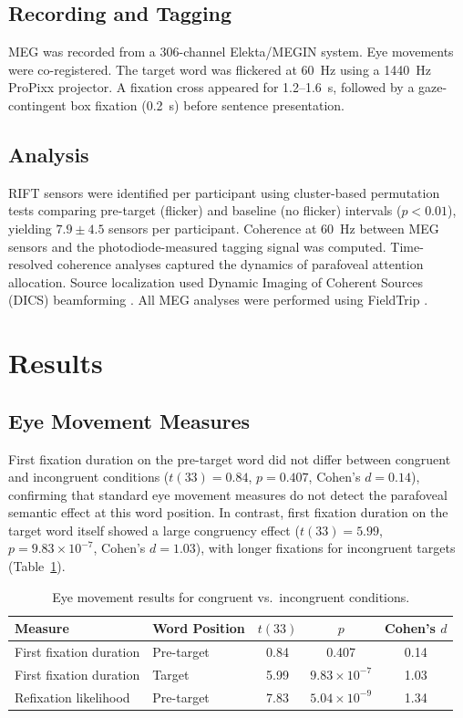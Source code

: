 \documentclass[12pt]{article}
\begin{document}
\subsection{Recording and Tagging}

MEG was recorded from a 306-channel Elekta/MEGIN system. Eye movements were co-registered. The target word was flickered at 60~Hz using a 1440~Hz ProPixx projector. A fixation cross appeared for 1.2--1.6~s, followed by a gaze-contingent box fixation (0.2~s) before sentence presentation.

\subsection{Analysis}

RIFT sensors were identified per participant using cluster-based permutation tests \citep{maris2007nonparametric} comparing pre-target (flicker) and baseline (no flicker) intervals ($p < 0.01$), yielding $7.9 \pm 4.5$ sensors per participant. Coherence at 60~Hz between MEG sensors and the photodiode-measured tagging signal was computed. Time-resolved coherence analyses captured the dynamics of parafoveal attention allocation. Source localization used Dynamic Imaging of Coherent Sources (DICS) beamforming \citep{gross2001dynamic}. All MEG analyses were performed using FieldTrip \citep{oostenveld2011fieldtrip}.

\section{Results}

\subsection{Eye Movement Measures}

First fixation duration on the pre-target word did not differ between congruent and incongruent conditions ($t(33) = 0.84$, $p = 0.407$, Cohen's $d = 0.14$), confirming that standard eye movement measures do not detect the parafoveal semantic effect at this word position. In contrast, first fixation duration on the target word itself showed a large congruency effect ($t(33) = 5.99$, $p = 9.83 \times 10^{-7}$, Cohen's $d = 1.03$), with longer fixations for incongruent targets (Table~\ref{tab:eyemovements}).

\begin{table}[ht]
\centering
\caption{Eye movement results for congruent vs.\ incongruent conditions.}
\label{tab:eyemovements}
\begin{tabular}{llccc}
\toprule
Measure & Word Position & $t(33)$ & $p$ & Cohen's $d$ \\
\midrule
First fixation duration & Pre-target & 0.84 & 0.407 & 0.14 \\
First fixation duration & Target & 5.99 & $9.83 \times 10^{-7}$ & 1.03 \\
Refixation likelihood & Pre-target & 7.83 & $5.04 \times 10^{-9}$ & 1.34 \\
\bottomrule
\end{tabular}
\end{table}
\end{document}
